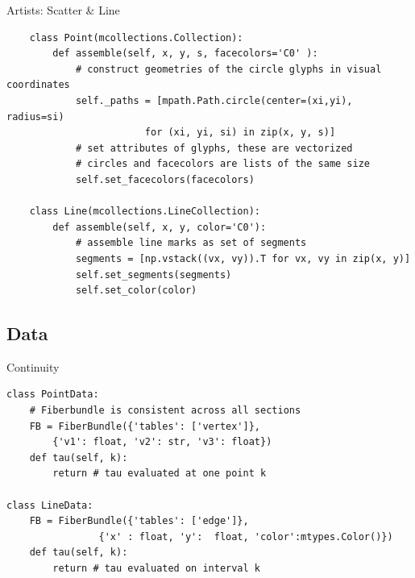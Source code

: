 \documentclass[xcolor={dvipsnames}, handout]{beamer}
\begin{document}
\begin{frame}[fragile]{Artists: Scatter \& Line}
\begin{verbatim}
    class Point(mcollections.Collection):
        def assemble(self, x, y, s, facecolors='C0' ):
            # construct geometries of the circle glyphs in visual coordinates
            self._paths = [mpath.Path.circle(center=(xi,yi), radius=si) 
                        for (xi, yi, si) in zip(x, y, s)] 
            # set attributes of glyphs, these are vectorized 
            # circles and facecolors are lists of the same size
            self.set_facecolors(facecolors)

    class Line(mcollections.LineCollection):
        def assemble(self, x, y, color='C0'):
            # assemble line marks as set of segments 
            segments = [np.vstack((vx, vy)).T for vx, vy in zip(x, y)]
            self.set_segments(segments)
            self.set_color(color)
    \end{verbatim}
\end{frame}

\subsection{Data}
\begin{frame}[fragile]{Continuity}
    \begin{verbatim}
class PointData: 
    # Fiberbundle is consistent across all sections
    FB = FiberBundle({'tables': ['vertex']},  
        {'v1': float, 'v2': str, 'v3': float})
    def tau(self, k):
        return # tau evaluated at one point k

class LineData: 
    FB = FiberBundle({'tables': ['edge']},
                {'x' : float, 'y':  float, 'color':mtypes.Color()})
    def tau(self, k): 
        return # tau evaluated on interval k
    \end{verbatim}
\end{frame}
\end{document}
